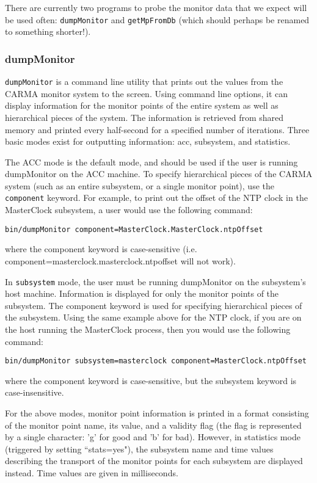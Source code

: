 \documentclass[preprint]{aastex}
\begin{document}
There are currently two programs to probe the monitor data that we expect
will be used often: {\tt dumpMonitor} and {\tt getMpFromDb}
(which should perhaps be renamed to something shorter!).

\subsubsection{dumpMonitor}

{\tt dumpMonitor} is a command line utility that prints out the values from the
CARMA monitor system to the screen.  Using command line options, it can
display information for the monitor points of the entire system as well as
hierarchical pieces of the system.  The information is retrieved from
shared memory and printed every half-second for a specified number of
iterations.  Three basic modes exist for outputting information:  acc,
subsystem, and statistics.

The ACC mode is the default mode, and should be used if the user is
running dumpMonitor on the ACC machine.  To specify hierarchical pieces of
the CARMA system (such as an entire subsystem, or a single monitor point),
use the {\tt component} keyword.  For example, to print out the offset of the
NTP clock in the MasterClock subsystem, a user would use the following
command:
\begin{verbatim}
bin/dumpMonitor component=MasterClock.MasterClock.ntpOffset
\end{verbatim}

\noindent where the component keyword is case-sensitive (i.e.
component=masterclock.masterclock.ntpoffset will not work).

In {\tt subsystem} mode, the user
must be running dumpMonitor on the subsystem's host machine.  Information
is displayed for only the monitor points of the subsystem.  The component
keyword is used for specifying hierarchical pieces of the subsystem.  
Using the same example above for the NTP clock, if you are on the host
running the MasterClock process, then you would use the following command:

\begin{verbatim}
bin/dumpMonitor subsystem=masterclock component=MasterClock.ntpOffset
\end{verbatim}

\noindent where the component keyword 
is case-sensitive, but the subsystem keyword is case-insensitive.

For the above modes, monitor point information is printed in a format
consisting of the monitor point name, its value, and a validity flag (the
flag is represented by a single character: 'g' for good and 'b' for bad).  
However, in statistics mode (triggered by setting ``stats=yes"), the
subsystem name and time values describing the transport of the monitor
points for each subsystem are displayed instead.  Time values are given in 
milliseconds.
\end{document}

